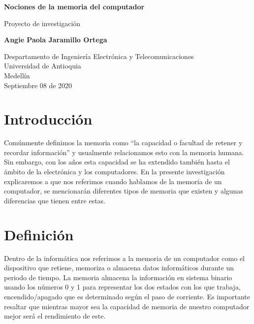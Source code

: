 \documentclass{article}
\begin{document}
\begin{titlepage}
    \begin{center}
        \vspace*{1cm}
            
        \Huge
        \textbf{Nociones de la memoria del computador}
            
        \vspace{0.5cm}
        \LARGE
        Proyecto de investigación
            
        \vspace{1.5cm}
            
        \textbf{Angie Paola Jaramillo Ortega}
            
        \vfill
            
        \vspace{0.8cm}
            
        \Large
        Despartamento de Ingeniería Electrónica y Telecomunicaciones\\
        Universidad de Antioquia\\
        Medellín\\
        Septiembre 08 de 2020
            
    \end{center}
\end{titlepage}

\tableofcontents
\newpage

\section{Introducción}
Comúnmente definimos la memoria como ``la capacidad o facultad de retener y recordar información''\cite{definicion} y usualmente relacionamos esto con la memoria humana. Sin embargo, con los años esta capacidad se ha extendido también hasta el ámbito de la electrónica y los computadores. En la presente investigación explicaremos a que nos referimos cuando hablamos de la memoria de un computador, se mencionarán diferentes tipos de memoria que existen y algunas diferencias que tienen entre estas.


\section{Definición}
Dentro de la informática nos referimos a la memoria de un computador como el dispositivo que retiene, memoriza o almacena datos informáticos durante un periodo de tiempo. La memoria almacena la información en sistema binario usando los números 0 y 1 para representar los dos estados con los que trabaja, encendido/apagado que es determinado según el paso de corriente. Es importante resaltar que mientras mayor sea la capacidad de memoria de nuestro computador mejor será el rendimiento de este.
\end{document}
